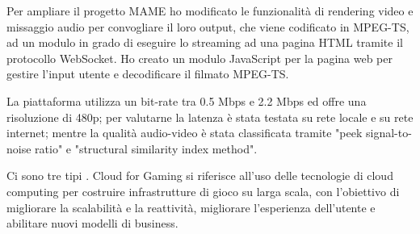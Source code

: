 Per ampliare il progetto MAME ho modificato le funzionalità di rendering video e missaggio audio per convogliare il loro output, che viene codificato in MPEG-TS, ad un modulo in grado di eseguire lo streaming ad una pagina HTML tramite il protocollo WebSocket. Ho creato un modulo JavaScript per la pagina web per gestire l'input utente e decodificare il filmato MPEG-TS.

La piattaforma utilizza un bit-rate tra 0.5 Mbps e 2.2 Mbps ed offre una risoluzione di 480p; per valutarne la latenza è stata testata su rete locale e su rete internet; mentre la qualità audio-video è stata classificata tramite "peek signal-to-noise ratio" e "structural similarity index method".





Ci sono tre tipi  \parencite{Cloud_for_Gaming}.
Cloud for Gaming si riferisce all'uso delle tecnologie di cloud computing per costruire infrastrutture di gioco su larga scala, con l'obiettivo di migliorare la scalabilità e la reattività, migliorare l'esperienza dell'utente e abilitare nuovi modelli di business.

